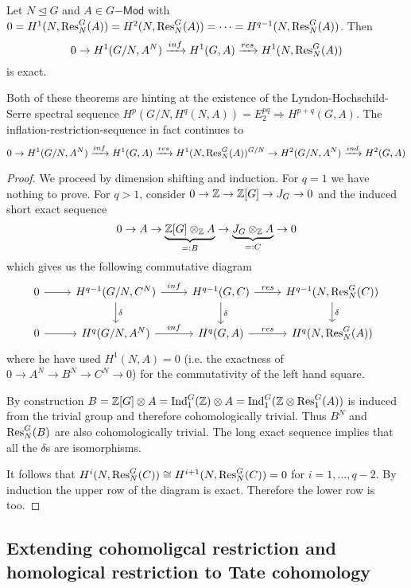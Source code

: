 \documentclass[fontsize=11pt,fleqn,a4paper]{scrartcl}
\begin{document}
\begin{theorem}
Let $N\unlhd G$ and $A\in G\mathsf{-Mod}$ with $0=H^1(N,\operatorname{Res}_N^G(A))=H^2(N,\operatorname{Res}_N^G(A)) = \cdots = H^{q-1}(N,\operatorname{Res}_N^G(A))$. Then
\[ 0 \to H^1(G/N,A^N) \xrightarrow{inf} H^1(G,A) \xrightarrow{res} H^1 (N,\operatorname{Res}_N^G(A))\]
is exact.
\end{theorem}

Both of these theorems are hinting at the existence of the Lyndon-Hochschild-Serre spectral sequence $H^p(G/N, H^q(N,A)) = E_2^{pq} \Rightarrow H^{p+q}(G,A)$. The inflation-restriction-sequence in fact continues to
\[ 0 \to H^1(G/N,A^N) \xrightarrow{inf} H^1(G,A) \xrightarrow{res} H^1(N,\operatorname{Res}_N^G(A))^{G/N} \to H^2(G/N,A^N) \xrightarrow{ind} H^2(G,A)\]


\begin{proof}
We proceed by dimension shifting and induction. For $q=1$ we have nothing to prove. For $q>1$, consider $0\to\mathbb{Z}\to\mathbb{Z}[G]\to J_G\to 0$ and the induced short exact sequence
\[0\to A \to \underbrace{\mathbb{Z}[G]\otimes_{\mathbb{Z}} A}_{=:B} \to \underbrace{J_G\otimes_{\mathbb{Z}} A}_{=:C} \to 0\]
which gives us the following commutative diagram
\[\begin{tikzcd}
0 \arrow[r] & H^{q-1}(G/N,C^N) \arrow[r,"inf"] \arrow[d,"\delta"] & H^{q-1}(G,C) \arrow[r,"res"] \arrow[d,"\delta"] & H^{q-1}(N,\Res_N^G(C)) \arrow[d,"\delta"] \\ 
0 \arrow[r] & H^q(G/N,A^N) \arrow[r,"inf"] & H^q(G,A) \arrow[r,"res"] & H^q(N,\Res_N^G(A)) 
\end{tikzcd}\]
where he have used $H^1(N,A) = 0$ (i.e. the exactness of $0\to A^N \to B^N\to C^N \to 0$) for the commutativity of the left hand square.

By construction $B=\mathbb{Z}[G]\otimes A = \operatorname{Ind}_1^G(\mathbb{Z})\otimes A = \operatorname{Ind}_1^G(\mathbb{Z}\otimes \operatorname{Res}_1^G(A))$ is induced from the trivial group and therefore cohomologically trivial. Thus $B^N$ and $\operatorname{Res}_N^G(B)$ are also cohomologically trivial. The long exact sequence implies that all the $\delta$s are isomorphisms.

It follows that $H^i(N,\operatorname{Res}_N^G(C)) \cong H^{i+1}(N,\operatorname{Res}_N^G(C)) = 0$ for $i=1,\ldots,q-2$. By induction the upper row of the diagram is exact. Therefore the lower row is too.
\end{proof}

\subsection{Extending cohomoligcal restriction and homological restriction to Tate cohomology}
\end{document}

